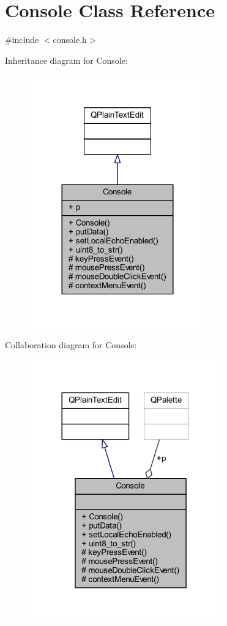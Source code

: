 \hypertarget{a00002}{\section{Console Class Reference}
\label{a00002}
}


{\ttfamily \#include $<$console.\+h$>$}



Inheritance diagram for Console\+:
\nopagebreak
\begin{figure}[H]
\begin{center}
\leavevmode
\includegraphics[width=216pt]{dc/dc9/a00282}
\end{center}
\end{figure}


Collaboration diagram for Console\+:
\nopagebreak
\begin{figure}[H]
\begin{center}
\leavevmode
\includegraphics[width=236pt]{dd/dfe/a00283}
\end{center}
\end{figure}
